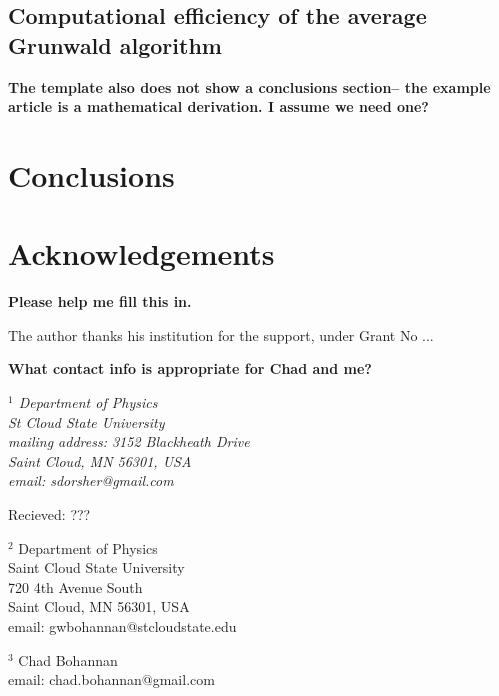 \documentclass[twoside,reqno,11pt]{fcaa}
\begin{document}
\vspace{-12pt}
\subsection{Computational efficiency of the average Grunwald algorithm}



{\bf The template also does not show a conclusions section-- the
  example article is a mathematical derivation. I assume we need one?}
\section{Conclusions}\label{conclusions}
\setcounter{section}{5}
\setcounter{equation}{0}




\smallskip
\section*{Acknowledgements}

{\bf Please help me fill this in.}

The author thanks his institution for the support, under Grant No
...






\bigskip \smallskip

{\bf What contact info is appropriate for Chad and me?}

\it
$^1$ Department of Physics \\
St Cloud State University \\
mailing address: 3152 Blackheath Drive \\
Saint Cloud, MN 56301, USA \\ [4pt]
email: sdorsher@gmail.com

\hfill Recieved: ???

$^2$ Department of Physics\\
Saint Cloud State University\\
720 4th Avenue South\\
Saint Cloud, MN 56301, USA\\ [4pt]
email: gwbohannan@stcloudstate.edu

$^3$ Chad Bohannan \\
email: chad.bohannan@gmail.com
\end{document}
